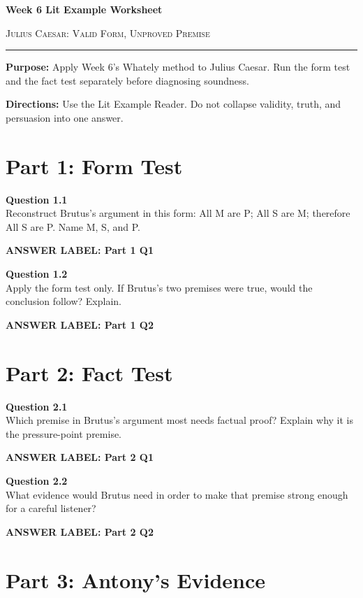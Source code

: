 \documentclass[12pt]{article}
\newcommand{\answerbox}[2]{%
\vspace{0.12em}
\noindent\textbf{#1}\par
\vspace{0.04em}
\noindent\fbox{%
\begin{minipage}[t][#2]{\dimexpr\textwidth-2\fboxsep-2\fboxrule}
\rule{\textwidth}{0pt}
\vspace{#2}
\end{minipage}}
\par\vspace{0.22em}}
\begin{document}
\begin{center}
{\LARGE\bfseries Week 6 Lit Example Worksheet}\par\vspace{0.05em}
{\large\scshape Julius Caesar: Valid Form, Unproved Premise}\par\vspace{0.12em}
\rule{0.78\textwidth}{0.5pt}
\end{center}

\textbf{Purpose:} Apply Week 6's Whately method to Julius Caesar. Run the form test and the fact test separately before diagnosing soundness.

\textbf{Directions:} Use the Lit Example Reader. Do not collapse validity, truth, and persuasion into one answer.

\section*{Part 1: Form Test}

\textbf{Question 1.1}\\[-0.15em]
Reconstruct Brutus's argument in this form: All M are P; All S are M; therefore All S are P. Name M, S, and P.

\answerbox{ANSWER LABEL: Part 1 Q1}{2.45in}

\textbf{Question 1.2}\\[-0.15em]
Apply the form test only. If Brutus's two premises were true, would the conclusion follow? Explain.

\answerbox{ANSWER LABEL: Part 1 Q2}{2.1in}

\newpage

\section*{Part 2: Fact Test}

\textbf{Question 2.1}\\[-0.15em]
Which premise in Brutus's argument most needs factual proof? Explain why it is the pressure-point premise.

\answerbox{ANSWER LABEL: Part 2 Q1}{2.35in}

\textbf{Question 2.2}\\[-0.15em]
What evidence would Brutus need in order to make that premise strong enough for a careful listener?

\answerbox{ANSWER LABEL: Part 2 Q2}{2.35in}

\newpage

\section*{Part 3: Antony's Evidence}
\end{document}

